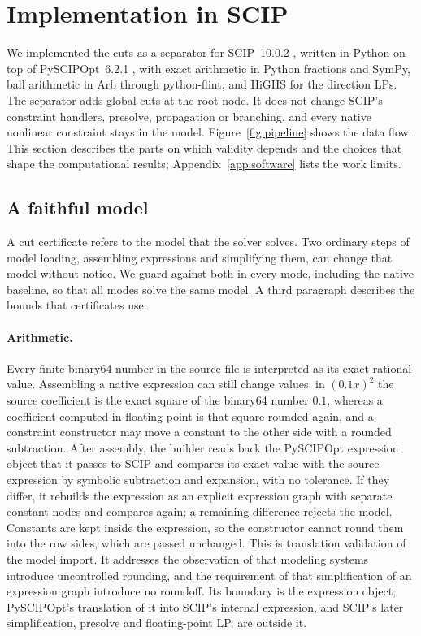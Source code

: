 \section{Implementation in SCIP}\label{sec:implementation}

We implemented the cuts as a separator for SCIP~10.0.2 \citep{SCIP10},
written in Python on top of PySCIPOpt~6.2.1 \citep{PySCIPOpt}, with exact
arithmetic in Python fractions and SymPy, ball arithmetic in Arb through
python-flint, and HiGHS for the direction LPs. The separator adds global cuts
at the root node. It does not change SCIP's constraint handlers, presolve,
propagation or branching, and every native nonlinear constraint stays in the
model. Figure~\ref{fig:pipeline} shows the data flow. This section describes
the parts on which validity depends and the choices that shape the
computational results; Appendix~\ref{app:software} lists the work limits.



\subsection{A faithful model}\label{sec:faithful}

A cut certificate refers to the model that the solver solves. Two ordinary
steps of model loading, assembling expressions and simplifying them, can
change that model without notice. We guard against both in every mode,
including the native baseline, so that all modes solve the same model. A
third paragraph describes the bounds that certificates use.

\paragraph{Arithmetic.}
Every finite binary64 number in the source file is interpreted as its exact
rational value. Assembling a native expression can still change values: in
$(0.1x)^2$ the source coefficient is the exact square of the binary64 number
$0.1$, whereas a coefficient computed in floating point is that square
rounded again, and a constraint constructor may move a constant to the other
side with a rounded subtraction. After assembly, the builder reads back the
PySCIPOpt expression object that it passes to SCIP and compares its exact
value with the source expression by symbolic subtraction and expansion, with
no tolerance. If they differ, it rebuilds the expression as an explicit
expression graph with separate constant nodes and compares again; a remaining
difference rejects the model. Constants are kept inside the expression, so
the constructor cannot round them into the row sides, which are passed
unchanged. This is translation validation
\citep{PnueliSiegelSingerman1998,Necula2000} of the model import. It
addresses the observation of \citet[Section~20]{Neumaier2004} that modeling
systems introduce uncontrolled rounding, and the requirement of
\citet[Section~3.1]{SchichlNeumaier2005} that simplification of an expression
graph introduce no roundoff. Its boundary is the expression object;
PySCIPOpt's translation of it into SCIP's internal expression, and SCIP's
later simplification, presolve and floating-point LP, are outside it.


